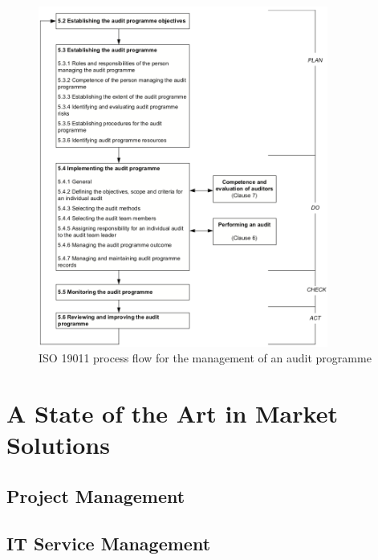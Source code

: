 \begin{figure}[b!]
\centering
\includegraphics[width=0.85\textwidth]{img/ISO19011AuditProcess.png}
\caption{ISO 19011 process flow for the management of an audit programme}
\end{figure}


\section{A State of the Art in Market Solutions}

\subsection{Project Management}

\subsection{IT Service Management}





